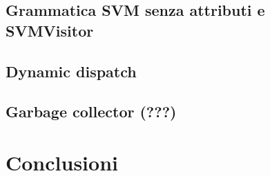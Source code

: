 \documentclass[a4paper]{article}   %
\begin{document}
\subsection{Grammatica SVM senza attributi e SVMVisitor}
\subsection{Dynamic dispatch}
\subsection{Garbage collector (???)}

\section{Conclusioni}

\end{document}
